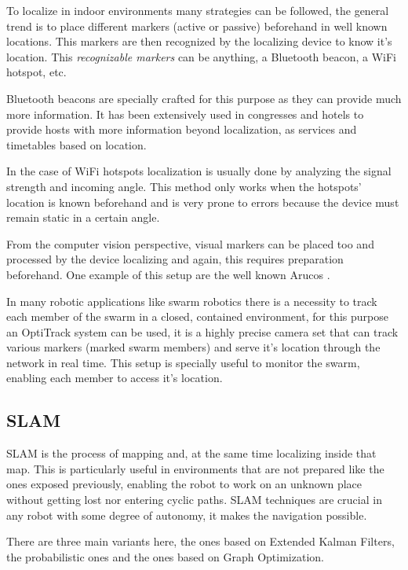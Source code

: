       To localize in indoor environments many strategies can be followed, the general trend is to place different markers (active or passive) beforehand in well known locations. This markers are then recognized by the localizing device to know it's location. This \textit{recognizable markers} can be anything, a Bluetooth beacon, a WiFi hotspot, etc.

      Bluetooth beacons are specially crafted for this purpose as they can provide much more information. It has been extensively used in congresses and hotels to provide hosts with more information beyond localization, as services and timetables based on location. 

      In the case of WiFi hotspots localization is usually done by analyzing the signal strength and incoming angle. This method only works when the hotspots' location is known beforehand and is very prone to errors because the device must remain static in a certain angle.

      From the computer vision perspective, visual markers can be placed too and processed by the device localizing and again, this requires preparation beforehand. One example of this setup are the well known Arucos \cite{romeroramirez201838}.

      In many robotic applications like swarm robotics there is a necessity to track each member of the swarm in a closed, contained environment, for this purpose an OptiTrack system \cite{optitrack_web} can be used, it is a highly precise camera set that can track various markers (marked swarm members) and serve it's location through the network in real time. This setup is specially useful to monitor the swarm, enabling each member to access it's location.

    \subsection{SLAM} \label{ch_3:sect:localization:slam}

      SLAM is the process of mapping and, at the same time localizing inside that map. This is particularly useful in environments that are not prepared like the ones exposed previously, enabling the robot to work on an unknown place without getting lost nor entering cyclic paths. SLAM techniques are crucial in any robot with some degree of autonomy, it makes the navigation possible. 

      There are three main variants here, the ones based on Extended Kalman Filters, the probabilistic ones and the ones based on Graph Optimization.

